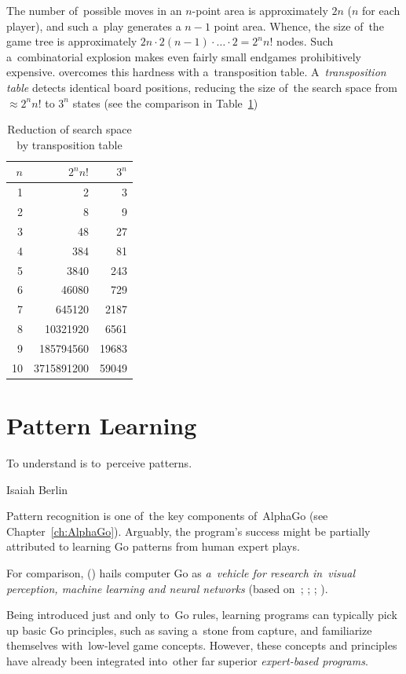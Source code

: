 The number of~possible moves in an $n$-point area is approximately $2n$ ($n$ for each player), and such a~play generates a $n-1$ point area.
Whence, the size of~the game tree is approximately $2n\cdot2(n-1)\cdot \ldots \cdot2 = 2^n n!$ nodes.
Such a~combinatorial explosion makes even fairly small endgames prohibitively expensive.
\Mueller{} overcomes this hardness with a~transposition table.
A~\emph{transposition table} detects identical board positions, reducing the size of~the search space from $\approx 2^n n!$ to $3^n$ states (see the comparison in Table~\ref{tab:reduction-transp-tab})
\begin{table}[!htbp]
  \centering
  \begin{tabular}{ |rrr| }
    \hline
    \textbf{$n$} & \textbf{$2^nn!$} & \textbf{$3^n$} \\
    \hline
    1	&	2	&	3 \\ 
    2	&	8	&	9 \\ 
    3	&	48	&	27 \\ 
    4	&	384	&	81 \\ 
    5	&	3840	&	243 \\ 
    6	&	46080	&	729 \\ 
    7	&	645120	&	2187 \\ 
    8	&	10321920	&	6561 \\ 
    9	&	185794560	&	19683 \\ 
    10	&	3715891200	&	59049 \\ 
    \hline
  \end{tabular}
  \caption{Reduction of search space by transposition table}
  \label{tab:reduction-transp-tab}
\end{table}

\section{Pattern Learning}
\epigraph{To understand is to~perceive patterns.}
{Isaiah Berlin}
Pattern recognition is one of~the key components of~AlphaGo (see Chapter~\ref{ch:AlphaGo}).
Arguably, the program's success might be partially attributed to learning Go patterns from human expert plays.

For comparison, (\cite{Muller1995computer}) hails computer Go as \emph{a~vehicle for research in~visual perception, machine learning and neural networks} (based on~\cite{Wilcox79}; \cite{Enderton1991golem}; \cite{Stoutamire1991machine}; \cite{Schraudolph1994temporal}).

Being introduced just and only to~Go rules, learning programs can typically pick up basic Go principles, such as saving a~stone from capture, and familiarize themselves with~low-level game concepts.
However, these concepts and principles have already been integrated into~other far superior \emph{expert-based programs}.

